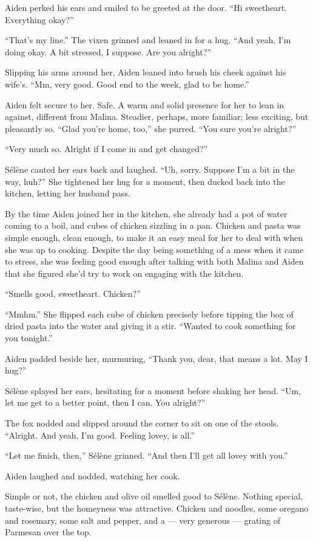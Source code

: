 Aiden perked his ears and smiled to be greeted at the door. ``Hi sweetheart. Everything okay?''

``That's my line.'' The vixen grinned and leaned in for a hug. ``And yeah, I'm doing okay. A bit stressed, I suppose. Are you alright?''

Slipping his arms around her, Aiden leaned into brush his cheek against his wife's. ``Mm, very good. Good end to the week, glad to be home.''

Aiden felt secure to her. Safe. A warm and solid presence for her to lean in against, different from Malina. Steadier, perhaps, more familiar; less exciting, but pleasantly so. ``Glad you're home, too,'' she purred. ``You sure you're alright?''

``Very much so. Alright if I come in and get changed?''

Sélène canted her ears back and laughed. ``Uh, sorry. Suppose I'm a bit in the way, huh?'' She tightened her hug for a moment, then ducked back into the kitchen, letting her husband pass.

By the time Aiden joined her in the kitchen, she already had a pot of water coming to a boil, and cubes of chicken sizzling in a pan. Chicken and pasta was simple enough, clean enough, to make it an easy meal for her to deal with when she was up to cooking. Despite the day being something of a mess when it came to stress, she was feeling good enough after talking with both Malina and Aiden that she figured she'd try to work on engaging with the kitchen.

``Smells good, sweetheart. Chicken?''

``Mmhm.'' She flipped each cube of chicken precisely before tipping the box of dried pasta into the water and giving it a stir. ``Wanted to cook something for you tonight.''

Aiden padded beside her, murmuring, ``Thank you, dear, that means a lot. May I hug?''

Sélène splayed her ears, hesitating for a moment before shaking her head. ``Um, let me get to a better point, then I can. You alright?''

The fox nodded and slipped around the corner to sit on one of the stools. ``Alright. And yeah, I'm good. Feeling lovey, is all.''

``Let me finish, then,'' Sélène grinned. ``And then I'll get all lovey with you.''

Aiden laughed and nodded, watching her cook.

Simple or not, the chicken and olive oil smelled good to Sélène. Nothing special, taste-wise, but the homeyness was attractive. Chicken and noodles, some oregano and rosemary, some salt and pepper, and a --- very generous --- grating of Parmesan over the top.

